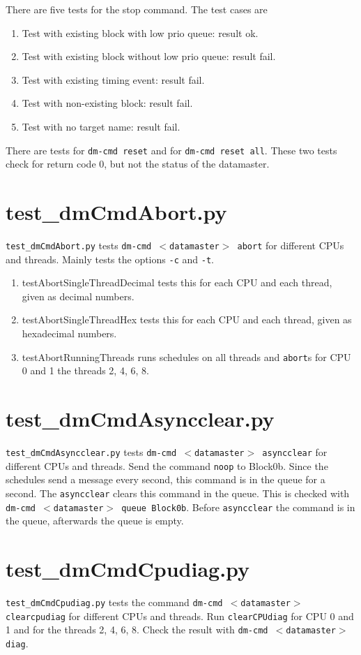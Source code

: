 \documentclass[12pt,a4paper]{report}
\begin{document}
There are five tests for the stop command. The test cases are
\begin{enumerate}
\item Test with existing block with low prio queue: result ok.
\item Test with existing block without low prio queue: result fail.
\item Test with existing timing event: result fail.
\item Test with non-existing block: result fail.
\item Test with no target name: result fail.
\end{enumerate}

There are tests for \texttt{dm-cmd reset} and for \texttt{dm-cmd reset all}. These two tests check for
return code 0, but not the status of the datamaster.

\section{test\_dmCmdAbort.py}
\texttt{test\_dmCmdAbort.py} tests \texttt{dm-cmd $<$datamaster$>$ abort} for different CPUs and threads.
Mainly tests the options \texttt{-c} and \texttt{-t}.
\begin{enumerate}
\item testAbortSingleThreadDecimal tests this for each CPU and each thread, given as decimal numbers.
\item testAbortSingleThreadHex tests this for each CPU and each thread, given as hexadecimal numbers.
\item testAbortRunningThreads runs schedules on all threads and \texttt{abort}s for CPU 0 and 1 the threads 2, 4, 6, 8.
\end{enumerate}

\section{test\_dmCmdAsyncclear.py}
\texttt{test\_dmCmdAsyncclear.py} tests \texttt{dm-cmd $<$datamaster$>$ asyncclear} for different CPUs and threads.
Send the command \texttt{noop} to Block0b. Since the schedules send a message every second, this command is in the queue
for a second. The \texttt{asyncclear} clears this command in the queue. This is
checked with \texttt{dm-cmd $<$datamaster$>$ queue Block0b}. Before
\texttt{asyncclear} the command is in the queue, afterwards the queue is empty.

\section{test\_dmCmdCpudiag.py}
\texttt{test\_dmCmdCpudiag.py} tests the command \texttt{dm-cmd
$<$datamaster$>$ clearcpudiag} for different CPUs and threads.
Run \texttt{clearCPUdiag} for CPU 0 and 1 and for the threads 2, 4, 6, 8.
Check the result with \texttt{dm-cmd $<$datamaster$>$ diag}.
\end{document}
